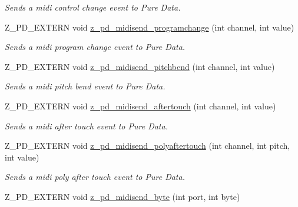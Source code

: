 \begin{DoxyCompactItemize}
\begin{DoxyCompactList}\small\item\em Sends a midi control change event to Pure Data. \end{DoxyCompactList}\item 
\hypertarget{group__zpd_gaf8781b26492c21c5406fa1d5123d71d4}{Z\-\_\-\-P\-D\-\_\-\-E\-X\-T\-E\-R\-N void \hyperlink{group__zpd_gaf8781b26492c21c5406fa1d5123d71d4}{z\-\_\-pd\-\_\-midisend\-\_\-programchange} (int channel, int value)}\label{group__zpd_gaf8781b26492c21c5406fa1d5123d71d4}

\begin{DoxyCompactList}\small\item\em Sends a midi program change event to Pure Data. \end{DoxyCompactList}\item 
\hypertarget{group__zpd_ga84ee350b4fe310814c926860b3f8491f}{Z\-\_\-\-P\-D\-\_\-\-E\-X\-T\-E\-R\-N void \hyperlink{group__zpd_ga84ee350b4fe310814c926860b3f8491f}{z\-\_\-pd\-\_\-midisend\-\_\-pitchbend} (int channel, int value)}\label{group__zpd_ga84ee350b4fe310814c926860b3f8491f}

\begin{DoxyCompactList}\small\item\em Sends a midi pitch bend event to Pure Data. \end{DoxyCompactList}\item 
\hypertarget{group__zpd_ga1fb2a5c9abf63f90bdaed671778b47c5}{Z\-\_\-\-P\-D\-\_\-\-E\-X\-T\-E\-R\-N void \hyperlink{group__zpd_ga1fb2a5c9abf63f90bdaed671778b47c5}{z\-\_\-pd\-\_\-midisend\-\_\-aftertouch} (int channel, int value)}\label{group__zpd_ga1fb2a5c9abf63f90bdaed671778b47c5}

\begin{DoxyCompactList}\small\item\em Sends a midi after touch event to Pure Data. \end{DoxyCompactList}\item 
\hypertarget{group__zpd_gad31ce05392e0cc0a00e90438335ebba0}{Z\-\_\-\-P\-D\-\_\-\-E\-X\-T\-E\-R\-N void \hyperlink{group__zpd_gad31ce05392e0cc0a00e90438335ebba0}{z\-\_\-pd\-\_\-midisend\-\_\-polyaftertouch} (int channel, int pitch, int value)}\label{group__zpd_gad31ce05392e0cc0a00e90438335ebba0}

\begin{DoxyCompactList}\small\item\em Sends a midi poly after touch event to Pure Data. \end{DoxyCompactList}\item 
\hypertarget{group__zpd_ga8f4e11e17320bba6e7504d24cafe9271}{Z\-\_\-\-P\-D\-\_\-\-E\-X\-T\-E\-R\-N void \hyperlink{group__zpd_ga8f4e11e17320bba6e7504d24cafe9271}{z\-\_\-pd\-\_\-midisend\-\_\-byte} (int port, int byte)}\label{group__zpd_ga8f4e11e17320bba6e7504d24cafe9271}


\end{DoxyCompactItemize}
